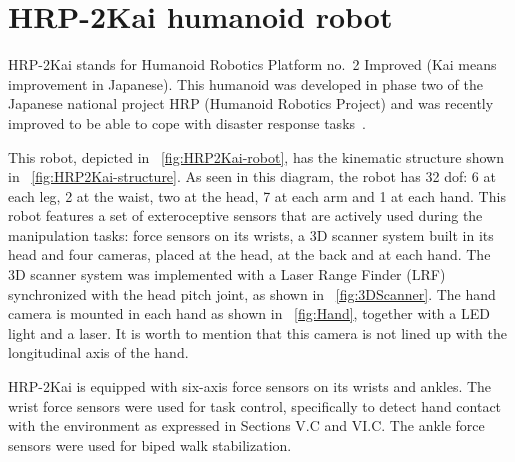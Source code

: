 \section{HRP-2Kai humanoid robot}
	\label{sec:hrp2kai}
	
	HRP-2Kai stands for Humanoid Robotics Platform no.~2 Improved (Kai means improvement in Japanese).
	This humanoid was developed in phase two of the Japanese national project HRP
	(Humanoid Robotics Project) and was recently improved to be able to cope with disaster response
	tasks~\cite{Kaneko}.
	
	This robot, depicted in \figurename~\ref{fig:HRP2Kai-robot}, has the kinematic structure shown
	in \figurename~\ref{fig:HRP2Kai-structure}.
	As seen in this diagram, the robot has 32 dof:
	6 at each leg, 2 at the waist, two at the head, 7 at each arm and 1 at each hand.
	This robot features a set of exteroceptive sensors that are actively used during the manipulation
	tasks: force sensors on its wrists, a 3D scanner system built in its head and four cameras,
	placed at the head, at the back and at each hand.
	The 3D scanner system was implemented with a Laser Range Finder (LRF) synchronized with the head
	pitch joint, as shown in \figurename~\ref{fig:3DScanner}.
	The hand camera is mounted in each hand as shown in \figurename~\ref{fig:Hand}, together with a
	LED light and a laser.
	It is worth to mention that this camera is not lined up with the longitudinal axis of the hand.


        HRP-2Kai is equipped with six-axis force sensors on its wrists and ankles. The wrist force sensors 
        were used for task control, specifically to detect hand contact with the environment as expressed in 
        Sections V.C and VI.C. The ankle force sensors were used for biped walk stabilization.
	
